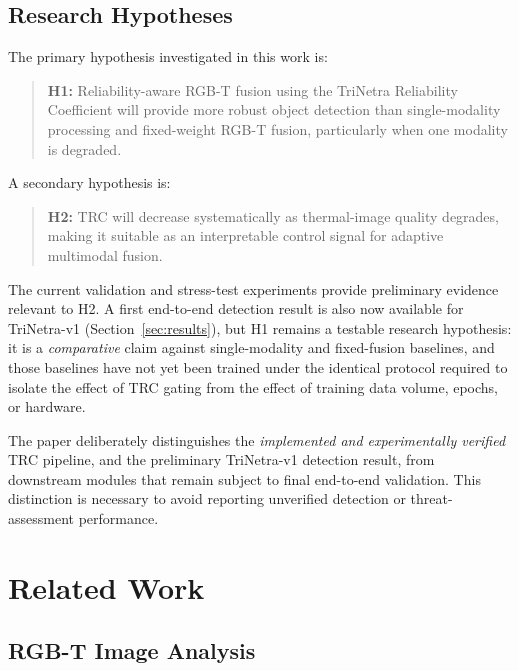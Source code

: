 \documentclass[conference]{IEEEtran}
\begin{document}
\subsection{Research Hypotheses}

The primary hypothesis investigated in this work is:

\begin{quote}
\textbf{H1:} Reliability-aware RGB-T fusion using the TriNetra
Reliability Coefficient will provide more robust object detection than
single-modality processing and fixed-weight RGB-T fusion, particularly
when one modality is degraded.
\end{quote}

A secondary hypothesis is:

\begin{quote}
\textbf{H2:} TRC will decrease systematically as thermal-image quality
degrades, making it suitable as an interpretable control signal for
adaptive multimodal fusion.
\end{quote}

The current validation and stress-test experiments provide preliminary
evidence relevant to H2. A first end-to-end detection result is also
now available for TriNetra-v1 (Section~\ref{sec:results}), but H1
remains a testable research hypothesis: it is a \emph{comparative}
claim against single-modality and fixed-fusion baselines, and those
baselines have not yet been trained under the identical protocol
required to isolate the effect of TRC gating from the effect of
training data volume, epochs, or hardware.

The paper deliberately distinguishes the \emph{implemented and experimentally verified} TRC pipeline, and the preliminary TriNetra-v1 detection result, from downstream modules that remain subject to final end-to-end validation. This distinction is necessary to avoid reporting unverified detection or threat-assessment performance.


\section{Related Work}

\subsection{RGB-T Image Analysis}
\end{document}
